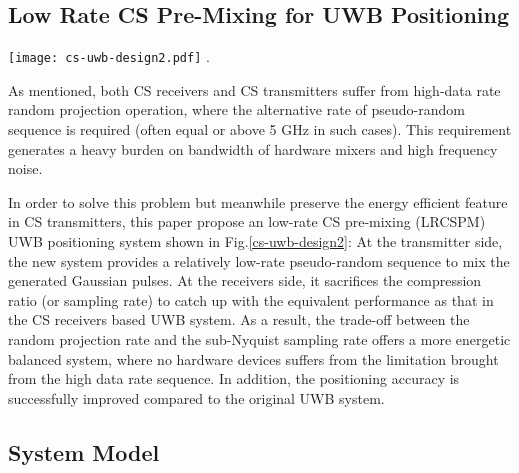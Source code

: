 \subsection{Low Rate CS Pre-Mixing for UWB Positioning}
\begin{figure*}[!t]
\centering
\texttt{[image: cs-uwb-design2.pdf]}
\DeclareGraphicsExtensions.
\caption{Block diagram of low-rate CS pre-filtering UWB positioning system.}
\label{cs-uwb-design2}
\end{figure*}

As mentioned, both CS receivers and CS transmitters suffer from high-data rate random projection operation, where the alternative rate of pseudo-random sequence is required (often equal or above 5 GHz in such cases). This requirement generates a heavy burden on bandwidth of hardware mixers and high frequency noise. 

In order to solve this problem but meanwhile preserve the energy efficient feature in CS transmitters, this paper propose an low-rate CS pre-mixing (LRCSPM) UWB positioning system shown in Fig.\ref{cs-uwb-design2}: At the transmitter side, the new system provides a relatively low-rate pseudo-random sequence to mix the generated Gaussian pulses. At the receivers side, it sacrifices the compression ratio (or sampling rate) to catch up with the equivalent performance as that in the CS receivers based UWB system. As a result, the trade-off between the random projection rate and the sub-Nyquist sampling rate offers a more energetic balanced system, where no hardware devices suffers from the limitation brought from the high data rate sequence. In addition, the positioning accuracy is successfully improved compared to the original UWB system. 

\subsection{System Model}

